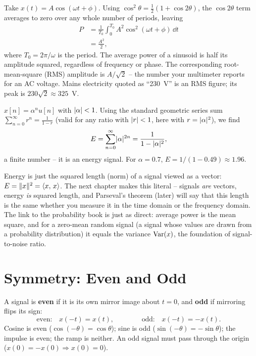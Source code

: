 \begin{example}
\label{ch02:ex-sine-power}
Take $x(t) = A\cos(\omega t + \phi)$. Using $\cos^2\theta = \tfrac12(1+\cos 2\theta)$,
the $\cos 2\theta$ term averages to zero over any whole number of periods, leaving
\begin{align*}
  P &= \frac{1}{T_0}\int_0^{T_0} A^2\cos^2(\omega t + \phi)\,\dd t \\
    &= \frac{A^2}{2},
\end{align*}
where $T_0 = 2\pi/\omega$ is the period. The average power of a sinusoid is half its amplitude squared, regardless of
frequency or phase. The corresponding root-mean-square (RMS) amplitude is
$A/\sqrt{2}$ -- the number your multimeter reports for an AC voltage. Mains
electricity quoted as ``230~V'' is an RMS figure; its peak is $230\sqrt2 \approx
325$~V.
\end{example}

\begin{example}
\label{ch02:ex-exp-energy}
$x[n] = \alpha^n u[n]$ with $\lvert\alpha\rvert<1$. Using the standard geometric series
sum $\sum_{n=0}^{\infty} r^n = \frac{1}{1-r}$ (valid for any ratio with $\lvert r\rvert<1$, here with $r = \lvert\alpha\rvert^2$),
we find
\[
  E = \sum_{n=0}^{\infty}\lvert\alpha\rvert^{2n} = \frac{1}{1-\lvert\alpha\rvert^2},
\]
a finite number -- it is an energy signal. For $\alpha = 0.7$,
$E = 1/(1-0.49) \approx 1.96$.
\end{example}

\begin{connectionbox}
Energy is just the squared length (norm) of a signal viewed as a vector:
$E = \lVert x\rVert^2 = \langle x,\, x \rangle$. The next chapter makes this literal -- signals
\emph{are} vectors, energy \emph{is} squared length, and Parseval's theorem (later)
will say that this length is the same whether you measure it in the time domain or
the frequency domain. The link to the probability book is just as direct: average
power is the mean square, and for a zero-mean random signal (a signal whose values are drawn from a probability distribution) it equals the variance
$\operatorname{Var}(x)$, the foundation of signal-to-noise ratio.
\end{connectionbox}

\section{Symmetry: Even and Odd}
\label{ch02:even-odd}

A signal is \textbf{even} if it is its own mirror image about $t=0$, and
\textbf{odd} if mirroring flips its sign:
\[
  \text{even:}\quad x(-t) = x(t), \qquad\qquad
  \text{odd:}\quad x(-t) = -x(t).
\]
Cosine is even ($\cos(-\theta)=\cos\theta$); sine is odd ($\sin(-\theta)=-\sin\theta$);
the impulse is even; the ramp is neither. An odd signal must pass through the origin
($x(0) = -x(0) \Rightarrow x(0)=0$).

